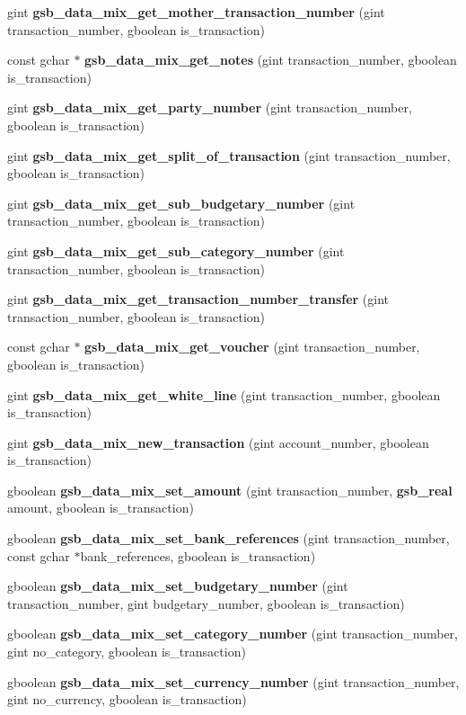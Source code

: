 \begin{DoxyCompactItemize}
\item 
gint {\bf gsb\_\-data\_\-mix\_\-get\_\-mother\_\-transaction\_\-number} (gint transaction\_\-number, gboolean is\_\-transaction)
\item 
const gchar $\ast$ {\bf gsb\_\-data\_\-mix\_\-get\_\-notes} (gint transaction\_\-number, gboolean is\_\-transaction)
\item 
gint {\bf gsb\_\-data\_\-mix\_\-get\_\-party\_\-number} (gint transaction\_\-number, gboolean is\_\-transaction)
\item 
gint {\bf gsb\_\-data\_\-mix\_\-get\_\-split\_\-of\_\-transaction} (gint transaction\_\-number, gboolean is\_\-transaction)
\item 
gint {\bf gsb\_\-data\_\-mix\_\-get\_\-sub\_\-budgetary\_\-number} (gint transaction\_\-number, gboolean is\_\-transaction)
\item 
gint {\bf gsb\_\-data\_\-mix\_\-get\_\-sub\_\-category\_\-number} (gint transaction\_\-number, gboolean is\_\-transaction)
\item 
gint {\bf gsb\_\-data\_\-mix\_\-get\_\-transaction\_\-number\_\-transfer} (gint transaction\_\-number, gboolean is\_\-transaction)
\item 
const gchar $\ast$ {\bf gsb\_\-data\_\-mix\_\-get\_\-voucher} (gint transaction\_\-number, gboolean is\_\-transaction)
\item 
gint {\bf gsb\_\-data\_\-mix\_\-get\_\-white\_\-line} (gint transaction\_\-number, gboolean is\_\-transaction)
\item 
gint {\bf gsb\_\-data\_\-mix\_\-new\_\-transaction} (gint account\_\-number, gboolean is\_\-transaction)
\item 
gboolean {\bf gsb\_\-data\_\-mix\_\-set\_\-amount} (gint transaction\_\-number, {\bf gsb\_\-real} amount, gboolean is\_\-transaction)
\item 
gboolean {\bf gsb\_\-data\_\-mix\_\-set\_\-bank\_\-references} (gint transaction\_\-number, const gchar $\ast$bank\_\-references, gboolean is\_\-transaction)
\item 
gboolean {\bf gsb\_\-data\_\-mix\_\-set\_\-budgetary\_\-number} (gint transaction\_\-number, gint budgetary\_\-number, gboolean is\_\-transaction)
\item 
gboolean {\bf gsb\_\-data\_\-mix\_\-set\_\-category\_\-number} (gint transaction\_\-number, gint no\_\-category, gboolean is\_\-transaction)
\item 
gboolean {\bf gsb\_\-data\_\-mix\_\-set\_\-currency\_\-number} (gint transaction\_\-number, gint no\_\-currency, gboolean is\_\-transaction)

\end{DoxyCompactItemize}

